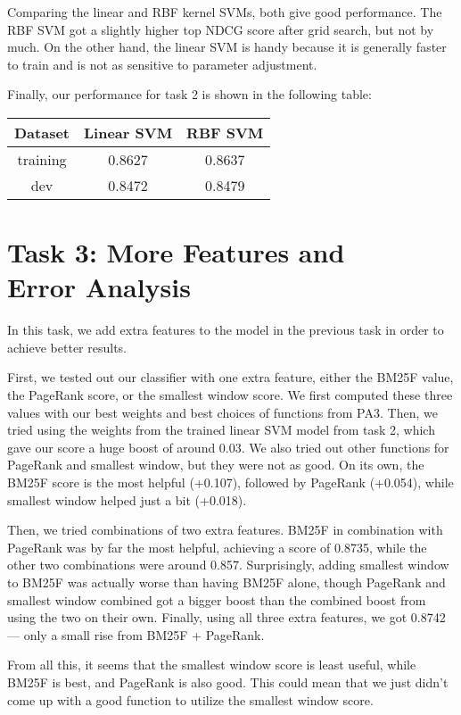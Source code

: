 \documentclass[10pt,twocolumn]{article}
\begin{document}
Comparing the linear and RBF kernel SVMs, both give good performance. The RBF SVM got a slightly higher top NDCG score after grid search, but not by much. On the other hand, the linear SVM is handy because it is generally faster to train and is not as sensitive to parameter adjustment.

Finally, our performance for task 2 is shown in the following table:
\begin{table}[H]
\centering
\begin{tabular}{|c|c|c|}
\hline
Dataset & Linear SVM & RBF SVM \\\hline
training & 0.8627 & 0.8637 \\\hline
dev & 0.8472 & 0.8479\\\hline
\end{tabular}
\end{table}

\section*{Task 3: More Features and \\Error Analysis}
In this task, we add extra features to the model in the previous task in order to achieve better results.

First, we tested out our classifier with one extra feature, either the BM25F value, the PageRank score, or the smallest window score. We first computed these three values with our best weights and best choices of functions from PA3. Then, we tried using the weights from the trained linear SVM model from task 2, which gave our score a huge boost of around 0.03. We also tried out other functions for PageRank and smallest window, but they were not as good. On its own, the BM25F score is the most helpful (+0.107), followed by PageRank (+0.054), while smallest window helped just a bit (+0.018).

Then, we tried combinations of two extra features. BM25F in combination with PageRank was by far the most helpful, achieving a score of 0.8735, while the other two combinations were around 0.857. Surprisingly, adding smallest window to BM25F was actually worse than having BM25F alone, though PageRank and smallest window combined got a bigger boost than the combined boost from using the two on their own. Finally, using all three extra features, we got 0.8742 --- only a small rise from BM25F + PageRank.

From all this, it seems that the smallest window score is least useful, while BM25F is best, and PageRank is also good. This could mean that we just didn't come up with a good function to utilize the smallest window score.
\end{document}

